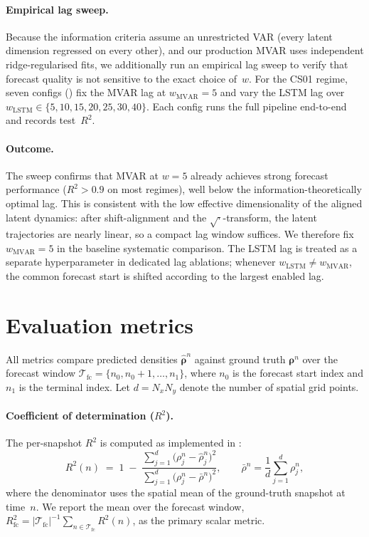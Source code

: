 \documentclass{report}
\theoremstyle{plain}
\theoremstyle{remark}
\numberwithin{equation}{section}              %
\begin{document}
\paragraph{Empirical lag sweep.}
Because the information criteria assume an unrestricted VAR (every latent
dimension regressed on every other), and our production MVAR uses
independent ridge-regularised fits, we additionally run an empirical lag
sweep to verify that forecast quality is not sensitive to the exact choice
of~$w$.  For the CS01 regime, seven configs
() fix the MVAR lag at
$w_{\mathrm{MVAR}}=5$ and vary the LSTM lag over
$w_{\mathrm{LSTM}}\in\{5,10,15,20,25,30,40\}$.
Each config runs the full pipeline end-to-end and records test~$R^2$.

\paragraph{Outcome.}
The sweep confirms that MVAR at $w{=}5$ already achieves strong forecast
performance ($R^2>0.9$ on most regimes), well below the
information-theoretically optimal lag.  This is consistent with the low
effective dimensionality of the aligned latent dynamics: after shift-alignment
and the $\sqrt{\cdot}$-transform, the latent trajectories are
nearly linear, so a compact lag window suffices.  We therefore fix
$w_{\mathrm{MVAR}}=5$ in the baseline systematic comparison.  The LSTM
lag is treated as a separate hyperparameter in dedicated lag ablations;
whenever $w_{\mathrm{LSTM}}\neq w_{\mathrm{MVAR}}$, the common forecast
start is shifted according to the largest enabled lag.

%
\section{Evaluation metrics}
\label{sec:metrics}

All metrics compare predicted densities $\hat{\boldsymbol{\rho}}^n$ against
ground truth $\boldsymbol{\rho}^n$ over the forecast window
$\mathcal{T}_{\mathrm{fc}} = \{n_0, n_0{+}1, \dots, n_1\}$, where $n_0$
is the forecast start index and $n_1$ is the terminal index.
Let $d = N_x N_y$ denote the number of spatial grid points.

\paragraph{Coefficient of determination ($R^2$).}
\label{subsec:r2_time}
The per-snapshot $R^2$ is computed as implemented in
:
\begin{equation}
  R^2(n) \;=\; 1 \;-\;
  \frac{\sum_{j=1}^{d}\bigl(\rho_j^n - \hat\rho_j^n\bigr)^2}
       {\sum_{j=1}^{d}\bigl(\rho_j^n - \bar\rho^n\bigr)^2},
  \qquad
  \bar\rho^n = \frac{1}{d}\sum_{j=1}^d \rho_j^n,
  \label{eq:r2_snapshot}
\end{equation}
where the denominator uses the spatial mean of the ground-truth snapshot at
time~$n$.  We report the mean over the forecast window,
$R^2_{\mathrm{fc}} = |\mathcal{T}_{\mathrm{fc}}|^{-1}\sum_{n\in\mathcal{T}_{\mathrm{fc}}} R^2(n)$,
as the primary scalar metric.
\end{document}
